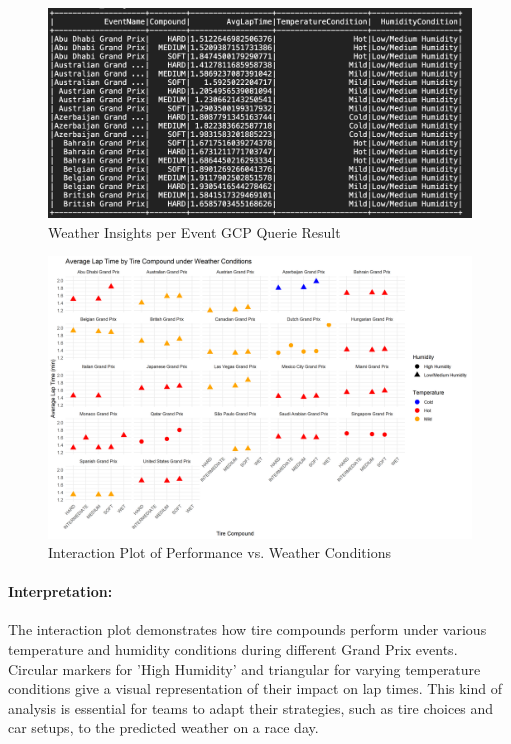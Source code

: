 \documentclass{article}
\begin{document}
\begin{figure}[H]
    \centering
    \includegraphics[width=\textwidth]{weather.png}
    \caption{Weather Insights per Event GCP Querie Result}
\end{figure}

\begin{figure}[H]
    \centering
    \includegraphics[width=\textwidth]{performance_weather_conditions_interaction_plot.png}
    \caption{Interaction Plot of Performance vs. Weather Conditions}
\end{figure}

\paragraph{Interpretation:}
The interaction plot demonstrates how tire compounds perform under various temperature and humidity conditions during different Grand Prix events. Circular markers for 'High Humidity' and triangular for varying temperature conditions give a visual representation of their impact on lap times. This kind of analysis is essential for teams to adapt their strategies, such as tire choices and car setups, to the predicted weather on a race day.
\end{document}
